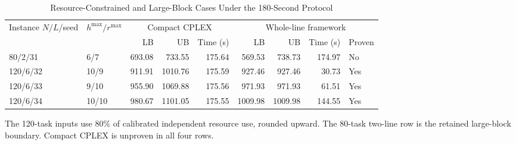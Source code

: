 \begin{table}[!t]
\caption{Resource-Constrained and Large-Block Cases Under the 180-Second Protocol}\label{tab:robust}\centering\small
\begin{tabular}{llrrrrrrl}\toprule
Instance $N/L$/seed & $h^{\max}/r^{\max}$ & \multicolumn{3}{c}{Compact CPLEX} & \multicolumn{4}{c}{Whole-line framework}\\\cmidrule(lr){3-5}\cmidrule(lr){6-9}& & LB & UB & Time (s) & LB & UB & Time (s) & Proven\\\midrule
80/2/31 & 6/7 & 693.08 & 733.55 & 175.64 & 569.53 & 738.73 & 174.97 & No\\
120/6/32 & 10/9 & 911.91 & 1010.76 & 175.59 & 927.46 & 927.46 & 30.73 & Yes\\
120/6/33 & 9/10 & 955.90 & 1069.88 & 175.56 & 971.93 & 971.93 & 61.51 & Yes\\
120/6/34 & 10/10 & 980.67 & 1101.05 & 175.55 & 1009.98 & 1009.98 & 144.55 & Yes\\
\bottomrule\end{tabular}
\par\smallskip\begin{minipage}{\textwidth}\footnotesize The 120-task inputs use 80\% of calibrated independent resource use, rounded upward. The 80-task two-line row is the retained large-block boundary. Compact CPLEX is unproven in all four rows.\end{minipage}
\end{table}
